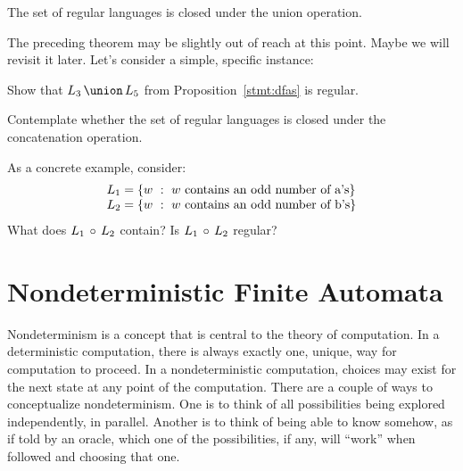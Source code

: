 \documentclass[twoside,letterpaper,openany]{book}
\begin{document}
\begin{thm3}
The set of regular languages is closed under the union operation.
\end{thm3}

\begin{discussion}The preceding theorem may be slightly out of reach at this point. Maybe we will revisit it later. Let's consider
a simple, specific instance:
\end{discussion}

\begin{exer2}
Show that $\setunion{L_3}{L_5}$ from Proposition~\ref{stmt:dfas} is regular.
\end{exer2}

\begin{exer2}
Contemplate whether the set of regular languages is closed under the concatenation operation. 

As a concrete example, consider:
\[\begin{array}{l}
L_1 = \left\lbrace w\ :\ w~\textrm{contains an odd number of a's} \right\rbrace \\
L_2 = \left\lbrace w\ :\ w~\textrm{contains an odd number of b's} \right\rbrace
\end{array}\]
What does $L_1\,\circ\,L_2$ contain? Is $L_1\,\circ\,L_2$ regular?
\end{exer2}



\clearpage 

\section{Nondeterministic Finite Automata}

\begin{discussion}
Nondeterminism is a concept that is central to the theory of computation. In a deterministic computation, there is always exactly one, unique, way for computation to proceed. In a nondeterministic computation, choices may exist for the next state at any point of the computation. There are a couple of ways to conceptualize nondeterminism. One is to think of all possibilities being explored independently, in parallel. Another is to think of being able to know somehow, as if told by an oracle, which one of the possibilities, if any, will ``work'' when followed and choosing that one.
\end{discussion}
\end{document}
